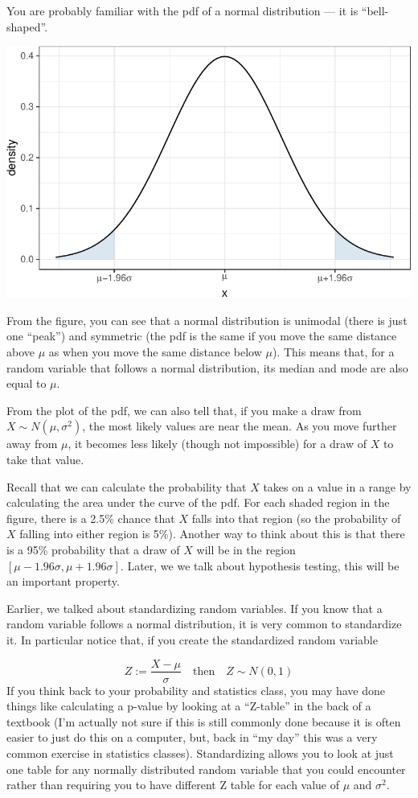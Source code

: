\documentclass[
  letterpaper,
  DIV=11,
  numbers=noendperiod]{scrreprt}
\begin{document}
You are probably familiar with the pdf of a normal distribution --- it
is ``bell-shaped''.

\includegraphics{02-probability_files/figure-pdf/unnamed-chunk-9-1.pdf}

From the figure, you can see that a normal distribution is unimodal
(there is just one ``peak'') and symmetric (the pdf is the same if you
move the same distance above \(\mu\) as when you move the same distance
below \(\mu\)). This means that, for a random variable that follows a
normal distribution, its median and mode are also equal to \(\mu\).

From the plot of the pdf, we can also tell that, if you make a draw from
\(X \sim N(\mu,\sigma^2)\), the most likely values are near the mean. As
you move further away from \(\mu\), it becomes less likely (though not
impossible) for a draw of \(X\) to take that value.

Recall that we can calculate the probability that \(X\) takes on a value
in a range by calculating the area under the curve of the pdf. For each
shaded region in the figure, there is a 2.5\% chance that \(X\) falls
into that region (so the probability of \(X\) falling into either region
is 5\%). Another way to think about this is that there is a 95\%
probability that a draw of \(X\) will be in the region
\([\mu-1.96\sigma, \mu+1.96\sigma]\). Later, we we talk about hypothesis
testing, this will be an important property.

Earlier, we talked about standardizing random variables. If you know
that a random variable follows a normal distribution, it is very common
to standardize it. In particular notice that, if you create the
standardized random variable

\[
  Z := \frac{X - \mu}{\sigma} \quad \textrm{then} \quad Z \sim N(0,1)
\] If you think back to your probability and statistics class, you may
have done things like calculating a p-value by looking at a ``Z-table''
in the back of a textbook (I'm actually not sure if this is still
commonly done because it is often easier to just do this on a computer,
but, back in ``my day'' this was a very common exercise in statistics
classes). Standardizing allows you to look at just one table for any
normally distributed random variable that you could encounter rather
than requiring you to have different Z table for each value of \(\mu\)
and \(\sigma^2\).
\end{document}
